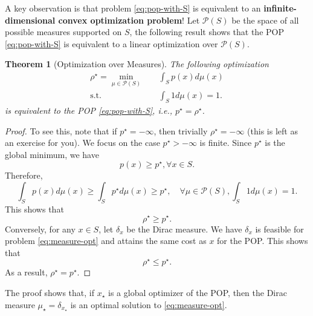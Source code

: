 \documentclass[
]{book}
\newtheorem{theorem}{Theorem}[chapter]
\theoremstyle{definition}
\theoremstyle{definition}
\theoremstyle{definition}
\theoremstyle{definition}
\theoremstyle{remark}
\begin{document}
A key observation is that problem \eqref{eq:pop-with-S} is equivalent to an \textbf{infinite-dimensional convex optimization problem}! Let \(\mathcal{P}(S)\) be the space of all possible measures supported on \(S\), the following result shows that the POP \eqref{eq:pop-with-S} is equivalent to a linear optimization over \(\mathcal{P}(S)\).

\begin{theorem}[Optimization over Measures]
\protect\hypertarget{thm:MeasureOpt}{}\label{thm:MeasureOpt}The following optimization
\begin{equation}
\begin{split}
\rho^\star = \min_{ \mu \in \mathcal{P}(S)} & \quad \int_S p(x) d \mu(x) \\
\mathrm{s.t.}& \quad \int_S 1 d \mu(x) = 1.
\end{split}
\label{eq:measure-opt}
\end{equation}
is equivalent to the POP \eqref{eq:pop-with-S}, i.e., \(p^\star = \rho^\star\).
\end{theorem}

\begin{proof}
To see this, note that if \(p^\star = -\infty\), then trivially \(\rho^\star = -\infty\) (this is left as an exercise for you). We focus on the case \(p^\star > - \infty\) is finite. Since \(p^\star\) is the global minimum, we have
\[
p(x) \geq p^\star, \forall x \in S.
\]
Therefore,
\[
\int_S p(x) d\mu(x) \geq \int_S p^\star d \mu(x) \geq p^\star, \quad \forall \mu \in \mathcal{P}(S), \int_S 1 d\mu(x) = 1.
\]
This shows that
\[
\rho^\star \geq p^\star.
\]
Conversely, for any \(x \in S\), let \(\delta_{x}\) be the Dirac measure. We have \(\delta_{x}\) is feasible for problem \eqref{eq:measure-opt} and attains the same cost as \(x\) for the POP. This shows that
\[
\rho^\star \leq p^\star.
\]
As a result, \(\rho^\star = p^\star\).
\end{proof}

The proof shows that, if \(x_\star\) is a global optimizer of the POP, then the Dirac measure \(\mu_\star = \delta_{x_\star}\) is an optimal solution to \eqref{eq:measure-opt}.
\end{document}
